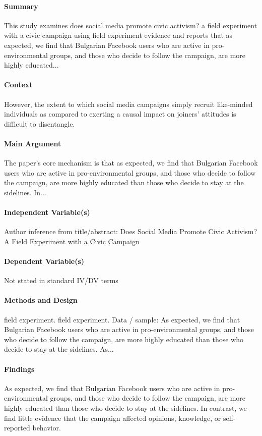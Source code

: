 \documentclass[12pt]{article}
\begin{document}
\paragraph{Summary} This study examines does social media promote civic activism? a field experiment with a civic campaign using field experiment evidence and reports that as expected, we find that Bulgarian Facebook users who are active in pro-environmental groups, and those who decide to follow the campaign, are more highly educated...

\paragraph{Context} However, the extent to which social media campaigns simply recruit like-minded individuals as compared to exerting a causal impact on joiners' attitudes is difficult to disentangle.

\paragraph{Main Argument} The paper's core mechanism is that as expected, we find that Bulgarian Facebook users who are active in pro-environmental groups, and those who decide to follow the campaign, are more highly educated than those who decide to stay at the sidelines. In...

\paragraph{Independent Variable(s)} Author inference from title/abstract: Does Social Media Promote Civic Activism? A Field Experiment with a Civic Campaign

\paragraph{Dependent Variable(s)} Not stated in standard IV/DV terms

\paragraph{Methods and Design} field experiment. field experiment. Data / sample: As expected, we find that Bulgarian Facebook users who are active in pro-environmental groups, and those who decide to follow the campaign, are more highly educated than those who decide to stay at the sidelines. As...

\paragraph{Findings} As expected, we find that Bulgarian Facebook users who are active in pro-environmental groups, and those who decide to follow the campaign, are more highly educated than those who decide to stay at the sidelines. In contrast, we find little evidence that the campaign affected opinions, knowledge, or self-reported behavior.
\end{document}
